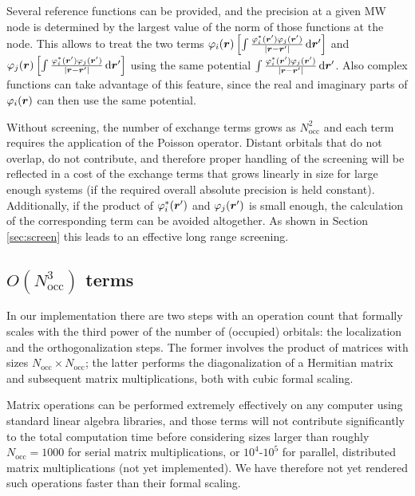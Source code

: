 \documentclass[journal=jctcce, manuscript=article]{achemso}
\begin{document}
Several reference functions can be provided, and the precision at a given \ac{MW} node is determined by the largest value of the norm of those functions at the node. This allows to treat the two terms $\varphi_i(\boldsymbol{r}) \left[\int \frac{\varphi^*_i(\boldsymbol{r}')\varphi_j(\boldsymbol{r}')}{|\boldsymbol{r}-\boldsymbol{r}'|} \, \mathrm{d}\boldsymbol{r}'\right]$ and  $\varphi_j(\boldsymbol{r}) \left[\int \frac{\varphi^*_i(\boldsymbol{r}')\varphi_j(\boldsymbol{r}')}{|\boldsymbol{r}-\boldsymbol{r}'|} \, \mathrm{d}\boldsymbol{r}'\right]$ using the same potential $\int \frac{\varphi^*_i(\boldsymbol{r}')\varphi_j(\boldsymbol{r}')}{|\boldsymbol{r}-\boldsymbol{r}'|} \, \mathrm{d}\boldsymbol{r}'$.  Also complex functions can take advantage of this feature, since the real and imaginary parts of $\varphi_i(\boldsymbol{r})$ can then use the same potential.

Without screening, the number of exchange terms grows as $N^2_{\mathrm{occ}}$ and each term requires the application of the Poisson operator. Distant orbitals that do not overlap, do not contribute, and therefore proper handling of the screening will be reflected in a cost of the exchange terms that grows linearly in size for large enough systems (if the required overall absolute precision is held constant). 
Additionally, if the product of $\varphi^*_i(\boldsymbol{r}')$ and $\varphi_j(\boldsymbol{r}')$ is small enough, the calculation of the corresponding term can be avoided altogether. As shown in Section \ref{sec:screen} this leads to an effective long range screening.

\subsection{$O(N_{\mathrm{occ}}^3)$ terms}
\label{sec:N3terms}

In our implementation there are two steps with an operation count that formally scales with the third power of the number of (occupied) orbitals: the localization
and the orthogonalization steps. The former involves the product of matrices with sizes $N_{\mathrm{occ}} \times N_{\mathrm{occ}}$; the latter performs the diagonalization of a Hermitian matrix and subsequent matrix multiplications, both with cubic formal scaling.

Matrix operations can be performed extremely effectively on any computer using standard linear algebra libraries, and those terms will not contribute significantly to the total computation time before considering sizes larger than roughly $N_{\mathrm{occ}}=1000$ for serial matrix multiplications, or $10^4$-$10^5$ for parallel, distributed matrix multiplications (not yet implemented). We have therefore not yet rendered such operations faster than their formal scaling.
\end{document}
